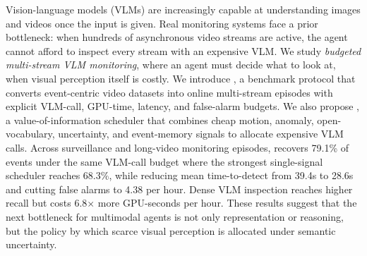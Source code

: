 Vision-language models (VLMs) are increasingly capable at understanding images and videos once the input is given. Real monitoring systems face a prior bottleneck: when hundreds of asynchronous video streams are active, the agent cannot afford to inspect every stream with an expensive VLM. We study \emph{budgeted multi-stream VLM monitoring}, where an agent must decide what to look at, when visual perception itself is costly. We introduce \benchmark, a benchmark protocol that converts event-centric video datasets into online multi-stream episodes with explicit VLM-call, GPU-time, latency, and false-alarm budgets. We also propose \method, a value-of-information scheduler that combines cheap motion, anomaly, open-vocabulary, uncertainty, and event-memory signals to allocate expensive VLM calls. Across surveillance and long-video monitoring episodes, \method{} recovers 79.1\% of events under the same VLM-call budget where the strongest single-signal scheduler reaches 68.3\%, while reducing mean time-to-detect from 39.4s to 28.6s and cutting false alarms to 4.38 per hour. Dense VLM inspection reaches higher recall but costs 6.8$\times$ more GPU-seconds per hour. These results suggest that the next bottleneck for multimodal agents is not only representation or reasoning, but the policy by which scarce visual perception is allocated under semantic uncertainty.
